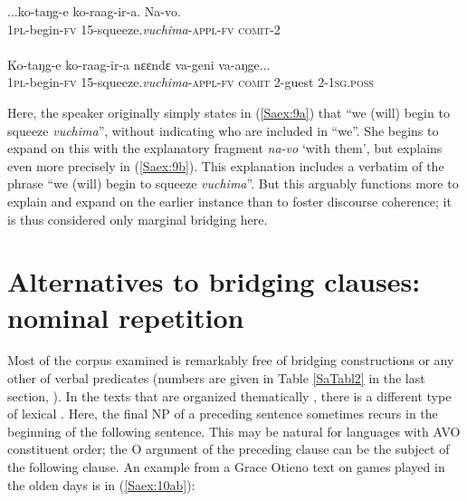 \documentclass[output=paper]{LSP/langsci}
\begin{document}
\begin{exe}
\ex \label{Saex:9ab}
\begin{xlist}
\ex \label{Saex:9a}
\gll ...ko-taŋg-e ko-raag-ir-a. Na-vo. \\
\textsc{1pl}-begin-\textsc{fv} \textsc{15}-squeeze.\textit{vuchima}-\textsc{appl-fv} \textsc{comit-2}\\
\glt {}\\
\ex \label{Saex:9b}
\gll Ko-taŋg-e ko-raag-ir-a nɛɛndɛ va-geni va-aŋge...\\     	       
   \textsc{1pl-}begin-\textsc{fv} \textsc{15}-squeeze.\textit{vuchima}-\textsc{appl-fv} \textsc{comit} \textsc{2}-guest \textsc{2}-\textsc{1sg.poss}\\
\glt {} 
\end{xlist}
\end{exe}


Here, the speaker originally simply states in (\ref{Saex:9a}) that ``we (will) begin to squeeze \textit{vuchima}'', without indicating who are included in ``we''. She begins to expand on this with the explanatory fragment \textit{na-vo} `with them', but explains even more precisely in (\ref{Saex:9b}). This explanation includes a verbatim  of the phrase ``we (will) begin to squeeze \textit{vuchima}''. But this  arguably functions more to explain and expand on the earlier instance than to foster discourse coherence; it is thus considered only marginal bridging here.


\section{Alternatives to bridging clauses: nominal repetition}
\label{Saalternatives}
Most of the  corpus examined is remarkably free of bridging constructions or any other  of verbal predicates (numbers are given in Table \ref{SaTabl2} in the last section, ). In the  texts that are organized thematically \citep{farr99}, there is a different type of lexical . Here, the final NP of a preceding  sentence sometimes recurs in the beginning of the following sentence. This may be natural for languages with AVO constituent order; the O argument of the preceding clause can be the subject of the following clause. An example from a Grace Otieno text on games played in the olden days is in (\ref{Saex:10ab}):
\end{document}
